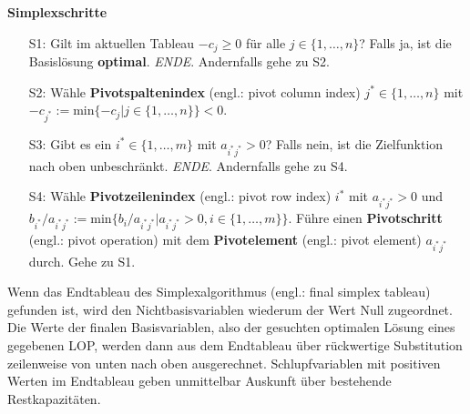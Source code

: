 \medskip
\noindent
{\bf Simplexschritte}
\nopagebreak
\begin{itemize}
\item[S1:] Gilt im aktuellen Tableau $-c_{j} \geq 0$
f\"ur alle $j \in \{1,\ldots,n\}$? Falls ja, ist die
Basisl\"osung {\bf optimal}. {\it ENDE}. Andernfalls gehe zu S2.

\item[S2:] W\"ahle {\bf Pivotspaltenindex} (engl.: pivot column 
index) $j^{*} \in
\{1,\ldots,n\}$ mit $-c_{j^{*}}:= \text{min}\{-c_{j}|j
\in \{1,\ldots,n\}\} < 0$.

\item[S3:] Gibt es ein $i^{*} \in \{1,\ldots,m\}$ mit
$a_{i^{*}j^{*}} > 0$? Falls nein, ist die Zielfunktion
nach oben unbeschr\"ankt. {\it ENDE}. Andernfalls gehe zu S4.

\item[S4:] W\"ahle {\bf Pivotzeilenindex} (engl.: pivot row index) 
$i^{*}$ mit
$a_{i^{*}j^{*}} > 0$ und $b_{i^{*}}/a_{i^{*}j^{*}}
:=\text{min}\{b_{i}/a_{i^{*}j^{*}}|a_{i^{*}j^{*}} > 0,
i \in \{1,\ldots,m\}\}$. F\"uhre einen {\bf Pivotschritt} (engl.: 
pivot operation) mit dem {\bf Pivotelement} (engl.: pivot element) 
$a_{i^{*}j^{*}}$ durch. Gehe zu S1.
\end{itemize}

\medskip
\noindent
Wenn das Endtableau des Simplexalgorithmus (engl.: final simplex
tableau) gefunden ist, wird den
Nichtbasisvariablen wiederum der Wert Null zugeordnet. Die Werte
der finalen Basisvariablen, also der gesuchten optimalen
L\"osung eines gegebenen LOP, werden dann aus dem Endtableau
\"uber r\"uckwertige Substitution zeilenweise von unten nach oben
ausgerechnet. Schlupfvariablen mit positiven Werten im Endtableau
geben unmittelbar Auskunft \"uber bestehende Restkapazit\"aten.


